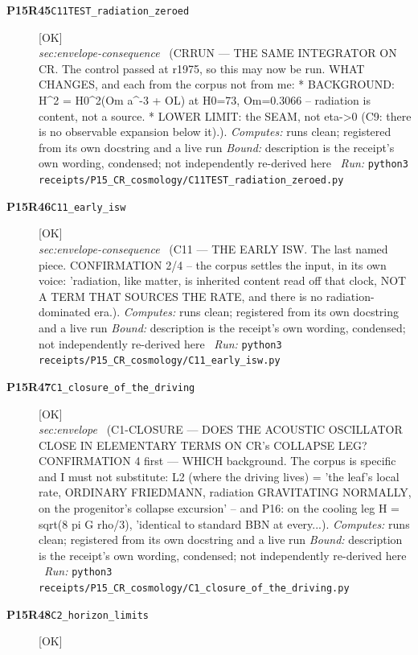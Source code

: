 \begin{description}
\item[\textbf{P15R45}\quad\texttt{C11TEST\_radiation\_zeroed}]\hfill\textsf{[OK]}\\
\textit{sec:envelope-consequence} \ (CRRUN --- THE SAME INTEGRATOR ON CR. The control passed at r1975, so this may now be run. WHAT CHANGES, and each from the corpus not from me: * BACKGROUND: H\textasciicircum{}2 = H0\textasciicircum{}2(Om a\textasciicircum{}-3 + OL) at H0=73, Om=0.3066 -- radiation is content, not a source. * LOWER LIMIT: the SEAM, not eta->0 (C9: there is no observable expansion below it).). 
\emph{Computes:} runs clean; registered from its own docstring and a live run
 \emph{Bound:} description is the receipt's own wording, condensed; not independently re-derived here
\ \emph{Run:} \texttt{python3 receipts/P15\_CR\_cosmology/C11TEST\_radiation\_zeroed.py}
\item[\textbf{P15R46}\quad\texttt{C11\_early\_isw}]\hfill\textsf{[OK]}\\
\textit{sec:envelope-consequence} \ (C11 --- THE EARLY ISW. The last named piece. CONFIRMATION 2/4 -- the corpus settles the input, in its own voice: 'radiation, like matter, is inherited content read off that clock, NOT A TERM THAT SOURCES THE RATE, and there is no radiation-dominated era.). 
\emph{Computes:} runs clean; registered from its own docstring and a live run
 \emph{Bound:} description is the receipt's own wording, condensed; not independently re-derived here
\ \emph{Run:} \texttt{python3 receipts/P15\_CR\_cosmology/C11\_early\_isw.py}
\item[\textbf{P15R47}\quad\texttt{C1\_closure\_of\_the\_driving}]\hfill\textsf{[OK]}\\
\textit{sec:envelope} \ (C1-CLOSURE --- DOES THE ACOUSTIC OSCILLATOR CLOSE IN ELEMENTARY TERMS ON CR's COLLAPSE LEG? CONFIRMATION 4 first --- WHICH background. The corpus is specific and I must not substitute: L2 (where the driving lives) = 'the leaf's local rate, ORDINARY FRIEDMANN, radiation GRAVITATING NORMALLY, on the progenitor's collapse excursion' -- and P16: on the cooling leg \textbar{}H\textbar{} = sqrt(8 pi G rho/3), 'identical to standard BBN at every...). 
\emph{Computes:} runs clean; registered from its own docstring and a live run
 \emph{Bound:} description is the receipt's own wording, condensed; not independently re-derived here
\ \emph{Run:} \texttt{python3 receipts/P15\_CR\_cosmology/C1\_closure\_of\_the\_driving.py}
\item[\textbf{P15R48}\quad\texttt{C2\_horizon\_limits}]\hfill\textsf{[OK]}\\

\end{description}
